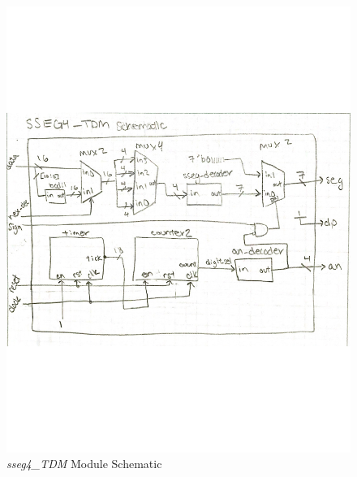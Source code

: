 \documentclass[11pt]{article}
\begin{document}
\begin{figure}[ht]\centering
	\includegraphics[width=1\textwidth]{sseg4_sch}
	\caption{\textit{sseg4\_TDM} Module Schematic}
	\label{fig:sim_with_table}
\end{figure}
\end{document}
